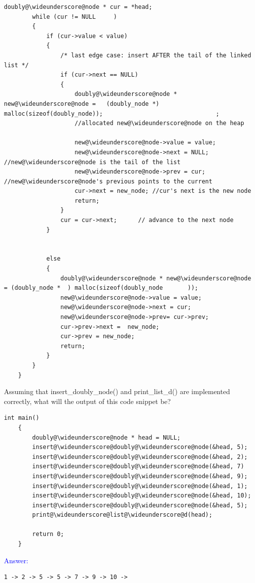 \documentclass{article}
\begin{document}
\begin{enumerate}[label=(\alph*)]
\begin{lstlisting}[style = CStyle]
        doubly@\wideunderscore@node * cur = *head;
        while (cur != NULL     )
        {
            if (cur->value < value)
            {
                /* last edge case: insert AFTER the tail of the linked list */
                if (cur->next == NULL)
                {
                    doubly@\wideunderscore@node * new@\wideunderscore@node =   (doubly_node *) malloc(sizeof(doubly_node));                                ; 
                    //allocated new@\wideunderscore@node on the heap

                    new@\wideunderscore@node->value = value;
                    new@\wideunderscore@node->next = NULL; //new@\wideunderscore@node is the tail of the list
                    new@\wideunderscore@node->prev = cur; //new@\wideunderscore@node's previous points to the current
                    cur->next = new_node; //cur's next is the new node
                    return;
                }
                cur = cur->next;      // advance to the next node
            }
           

            else 
            {
                doubly@\wideunderscore@node * new@\wideunderscore@node = (doubly_node *  ) malloc(sizeof(doubly_node       ));
                new@\wideunderscore@node->value = value;
                new@\wideunderscore@node->next = cur;
                new@\wideunderscore@node->prev= cur->prev;
                cur->prev->next =  new_node;
                cur->prev = new_node;
                return;
            }
        }
    }
\end{lstlisting}

Assuming that insert\_doubly\_node() and print\_list\_d() are implemented correctly, what will the output of this code snippet be? 

\begin{lstlisting}[style = CStyle]
    int main()
    {
        doubly@\wideunderscore@node * head = NULL;
        insert@\wideunderscore@doubly@\wideunderscore@node(&head, 5);
        insert@\wideunderscore@doubly@\wideunderscore@node(&head, 2);
        insert@\wideunderscore@doubly@\wideunderscore@node(&head, 7)
        insert@\wideunderscore@doubly@\wideunderscore@node(&head, 9);
        insert@\wideunderscore@doubly@\wideunderscore@node(&head, 1);
        insert@\wideunderscore@doubly@\wideunderscore@node(&head, 10);
        insert@\wideunderscore@doubly@\wideunderscore@node(&head, 5);
        print@\wideunderscore@list@\wideunderscore@d(head);

        return 0;
    }
\end{lstlisting}

\textcolor{blue} {Answer:}
\begin{lstlisting}[style=CStyle]
1 -> 2 -> 5 -> 5 -> 7 -> 9 -> 10 ->
\end{lstlisting}

\end{enumerate}
\newpage
\end{document}
